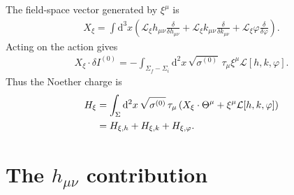 \documentclass[11pt]{article}
\newcommand{\dd}{\mathrm{d}}
\newcommand{\cL}{\mathcal{L}}
\newcommand{\Lie}{\mathcal{L}}
\begin{document}
The field-space vector generated by $\xi^\mu$ is
\begin{align}
  X_\xi
  =\int\dd^3x\left(
    \Lie_\xi h_{\mu\nu}\frac{\delta}{\delta h_{\mu\nu}}
    +\Lie_\xi k_{\mu\nu}\frac{\delta}{\delta k_{\mu\nu}}
    +\Lie_\xi\varphi\frac{\delta}{\delta\varphi}
  \right).
\end{align}
Acting on the action gives
\begin{align}
  X_\xi\cdot\delta I^{(0)}
  =-\int_{\Sigma_f-\Sigma_i}
    \dd^2x\,\sqrt{\sigma^{(0)}}\,\tau_\mu\xi^\mu
    \cL[h,k,\varphi].
\end{align}
Thus the Noether charge is
\begin{align}
  H_\xi
  &=\int_\Sigma\dd^2x\,\sqrt{\sigma^{(0)}}\,\tau_\mu
    \left(X_\xi\cdot\Theta^\mu+\xi^\mu\cL[h,k,\varphi]\right) \notag\\
  &=H_{\xi,h}+H_{\xi,k}+H_{\xi,\varphi}.
\end{align}

\section*{The $h_{\mu\nu}$ contribution}
\end{document}
